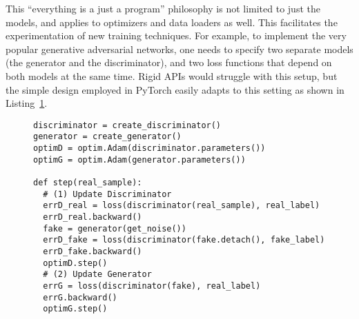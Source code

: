 \begin{minipage}{\textwidth}
\begin{parcolumns}{2}
\end{parcolumns}
\label{lst:code_example}
\end{minipage}
\bigskip

This ``everything is a just a program'' philosophy is not limited to just the models, and applies to optimizers and data loaders as well. This facilitates the experimentation of new training techniques. For example, to implement the very popular generative adversarial networks, one needs to specify two separate models (the generator and the discriminator), and two loss functions that depend on both models at the same time. Rigid APIs would struggle with this setup, but the simple design employed in PyTorch easily adapts to this setting as shown in Listing~\ref{lst:gan}.

\begin{figure}[thp]
\centering 


\begin{minipage}{.6\textwidth}
\begin{verbatim}
discriminator = create_discriminator()
generator = create_generator()
optimD = optim.Adam(discriminator.parameters())
optimG = optim.Adam(generator.parameters())

def step(real_sample):
  # (1) Update Discriminator
  errD_real = loss(discriminator(real_sample), real_label)
  errD_real.backward()
  fake = generator(get_noise())
  errD_fake = loss(discriminator(fake.detach(), fake_label)
  errD_fake.backward()
  optimD.step()
  # (2) Update Generator
  errG = loss(discriminator(fake), real_label)
  errG.backward()
  optimG.step()

\end{verbatim}
\label{lst:gan}
\end{minipage}
\end{figure}

